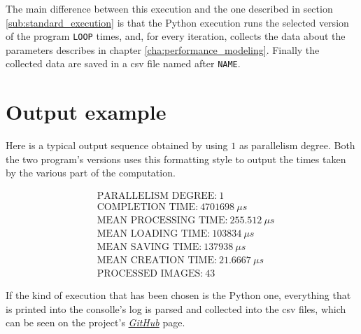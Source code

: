             The main difference between this execution and the one described in section
            \ref{sub:standard_execution} is that the Python execution runs the selected version of the program
            \texttt{LOOP} times, and, for every iteration, collects the data about the parameters describes in
            chapter \ref{cha:performance_modeling}. Finally the collected data are saved in a csv file named
            after \texttt{NAME}.
    \section{Output example} %
    \label{sec:output_example}
        Here is a typical output sequence obtained by using $1$ as parallelism degree. Both the two program's
        versions uses this formatting style to output the times taken by the various part of the computation.

        \begin{align*}
            &\text{PARALLELISM DEGREE:} \ 1 \\
            &\text{COMPLETION TIME:} \ 4701698 \ \mu s \\
            &\text{MEAN PROCESSING TIME:} \ 255.512 \ \mu s \\
            &\text{MEAN LOADING TIME:} \ 103834 \ \mu s \\
            &\text{MEAN SAVING TIME:} \ 137938 \ \mu s \\
            &\text{MEAN CREATION TIME:} \ 21.6667 \ \mu s \\
            &\text{PROCESSED IMAGES:} \ 43
        \end{align*}

        If the kind of execution that has been chosen is the Python one, everything that is printed into the
        consolle's log is parsed and collected into the csv files, which can be seen on the project's
        \href{https://github.com/germz01/PDS_project}{\textit{GitHub}} page.
